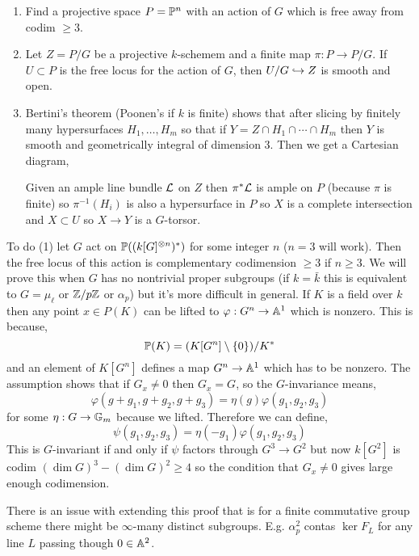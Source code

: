 \documentclass[12pt]{article}
\begin{document}
\begin{enumerate}
\item Find a projective space $P = \P^n$ with an action of $G$ which is free away from codim $\ge 3$. 

\item Let $Z = P / G$ be a projective $k$-schemem and a finite map $\pi : P \to P / G$. If $U \subset P$ is the free locus for the action of $G$, then $U / G \embed Z$ is smooth and open.

\item Bertini's theorem (Poonen's if $k$ is finite) shows that after slicing by finitely many hypersurfaces $H_1, \dots, H_m$ so that if $Y = Z \cap H_1 \cap \cdots \cap H_m$ then $Y$ is smooth and geometrically integral of dimension $3$. Then we get a Cartesian diagram,
\begin{center}
\end{center}
Given an ample line bundle $\L$ on $Z$ then $\pi^* \L$ is ample on $P$ (because $\pi$ is finite) so $\pi^{-1}(H_i)$ is also a hypersurface in $P$ so $X$ is a complete intersection and $X \subset U$ so $X \to Y$ is a $G$-torsor. 
\end{enumerate}

To do (1) let $G$ act on $\P((k[G]^{\ot n})^*)$ for some integer $n$ ($n = 3$ will work). Then the free locus of this action is complementary codimension $\ge 3$ if $n \ge 3$. We will prove this when $G$ has no nontrivial proper subgroups (if $k = \bar{k}$ this is equivalent to $G = \mu_\ell$ or $\Z / p \Z$ or $\alpha_p$) but it's more difficult in general. If $K$ is a field over $k$ then any point $x \in P(K)$ can be lifted to $\varphi : G^n \to \A^1$ which is nonzero. This is because,
\[ \P(K) = (K[G^n] \setminus \{ 0 \}) / K^* \]
and an element of $K[G^n]$ defines a map $G^n \to \A^1$ which has to be nonzero. The assumption shows that if $G_x \neq 0$ then $G_x = G$, so the $G$-invariance means,
\[ \varphi(g + g_1, g + g_2, g + g_3) = \eta(g) \varphi(g_1, g_2, g_3) \]
for some $\eta : G \to \Gm$ because we lifted. Therefore we can define,
\[ \psi(g_1, g_2, g_3) = \eta(-g_1) \varphi(g_1, g_2, g_3) \]
This is $G$-invariant if and only if $\psi$ factors through $G^3 \to G^2$ but now $k[G^2]$ is codim $(\dim{G})^3 - (\dim{G})^2 \ge 4$ so the condition that $G_x \neq 0$ gives large enough codimension.

\begin{rmk}
There is an issue with extending this proof that is for a finite commutative group scheme there might be $\infty$-many distinct subgroups. E.g. $\alpha_p^2$ contas $\ker{F_L}$ for any line $L$ passing though $0 \in \A^2$.
\end{rmk}
\end{document}
